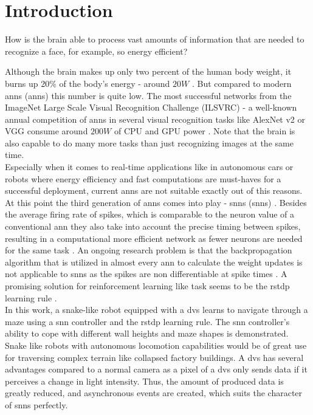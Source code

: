 \chapter{Introduction}
\label{chapter:introduction}

How is the brain able to process vast amounts of information that are needed to recognize a face, for example, so energy efficient?

Although the brain makes up only two percent of the human body weight, it burns up \(20\%\) of the body's energy - around \(20W\) \cite{Drubach1999}.
But compared to modern \acrlong{ann}s (\acrshort{ann}s) this number is quite low.
The most successful networks from the ImageNet Large Scale Visual Recognition Challenge (ILSVRC) \cite{ImageNetWebsite} - a well-known annual competition of \acrshort{ann}s in several visual recognition tasks like AlexNet v2 \cite{Krizhevsky2014} or VGG \cite{Simonyan2014} consume around \(200W\) of CPU and GPU power \cite{Li2016}.
Note that the brain is also capable to do many more tasks than just recognizing images at the same time. \\

Especially when it comes to real-time applications like in autonomous cars or robots where energy efficiency and fast computations are must-haves for a successful deployment, current \acrshort{ann}s are not suitable exactly out of this reasons.
At this point the third generation of \acrshort{ann}s comes into play - \acrlong{snn}s (\acrshort{snn}s) \cite{Ponulak2011}.
Besides the average firing rate of spikes, which is comparable to the neuron value of a conventional \acrshort{ann} they also take into account the precise timing between spikes, resulting in a computational more efficient network as fewer neurons are needed for the same task \cite{Maass1997}.
An ongoing research problem is that the backpropagation algorithm that is utilized in almost every \acrshort{ann} to calculate the weight updates is not applicable to \acrshort{snn}s as the spikes are non differentiable at spike times \cite{Lee2016}.
A promising solution for reinforcement learning like task seems to be the \acrfull{rstdp} learning rule \cite{Florian2007}. \\

In this work, a snake-like robot equipped with a \acrfull{dvs} learns to navigate through a maze using a \acrshort{snn} controller and the \acrfull{rstdp} learning rule.
The \acrshort{snn} controller's ability to cope with different wall heights and maze shapes is demonstrated.
Snake like robots with autonomous locomotion capabilities would be of great use for traversing complex terrain like collapsed factory buildings.
A \acrshort{dvs} has several advantages compared to a normal camera as a pixel of a \acrshort{dvs} only sends data if it perceives a change in light intensity.
Thus, the amount of produced data is greatly reduced, and asynchronous events are created, which suits the character of \acrshort{snn}s perfectly.

